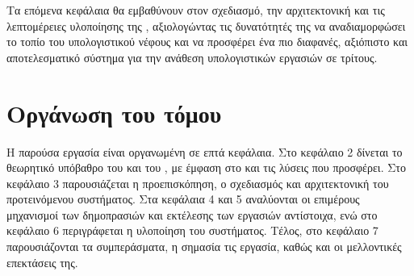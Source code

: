 Τα επόμενα κεφάλαια θα εμβαθύνουν στον σχεδιασμό, την αρχιτεκτονική και 
τις λεπτομέρειες υλοποίησης της , αξιολογώντας τις δυνατότητές της 
να αναδιαμορφώσει το τοπίο του υπολογιστικού νέφους και να προσφέρει ένα 
πιο διαφανές, αξιόπιστο και αποτελεσματικό σύστημα για την ανάθεση 
υπολογιστικών εργασιών σε τρίτους.



\section{Οργάνωση του τόμου}
Η παρούσα εργασία είναι οργανωμένη σε επτά κεφάλαια. Στο κεφάλαιο 2 δίνεται το θεωρητικό υπόβαθρο του  και του , με έμφαση στο  και τις λύσεις που προσφέρει. Στο κεφάλαιο 3 παρουσιάζεται η προεπισκόπηση, ο σχεδιασμός και αρχιτεκτονική του προτεινόμενου συστήματος. Στα κεφάλαια 4 και 5 αναλύονται οι επιμέρους μηχανισμοί των δημοπρασιών και εκτέλεσης των εργασιών αντίστοιχα, ενώ στο κεφάλαιο 6 περιγράφεται η υλοποίηση του συστήματος. Τέλος, στο κεφάλαιο 7 παρουσιάζονται τα συμπεράσματα, η σημασία τις εργασία, καθώς και οι μελλοντικές επεκτάσεις της.